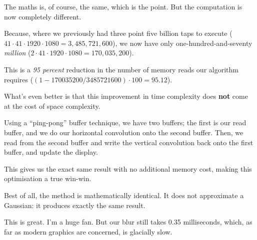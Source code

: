 \documentclass{article}
\begin{document}
\begin{appendices}
The maths is, of course, the same, which is the point. But the computation is now completely different.

Because, where we previously had three point five billion taps to execute ($41\cdot41\cdot1920\cdot1080=3{,}485{,}721{,}600$), we now have only one-hundred-and-seventy \textit{million} ($2\cdot41\cdot1920\cdot1080=170{,}035{,}200$).

This is a \textit{95 percent} reduction in the number of memory reads our algorithm requires ($(1-170035200/3485721600)\cdot100=95.12$).

What's even better is that this improvement in time complexity does \textbf{not} come at the cost of space complexity.

Using a ``ping-pong'' buffer technique, we have two buffers; the first is our read buffer, and we do our horizontal convolution onto the second buffer. Then, we read from the second buffer and write the vertical convolution back onto the first buffer, and update the display.

This gives us the exact same result with no additional memory cost, making this optimisation a true win-win.

Best of all, the method is mathematically identical. It does not approximate a Gaussian: it produces exactly the same result.

This is great. I'm a huge fan. But our blur still takes 0.35 milliseconds, which, as far as modern graphics are concerned, is glacially slow.
\end{appendices}

\clearpage
{}
{}

\nocite{own:sands-photo,own:fireworks-video}

\end{document}
